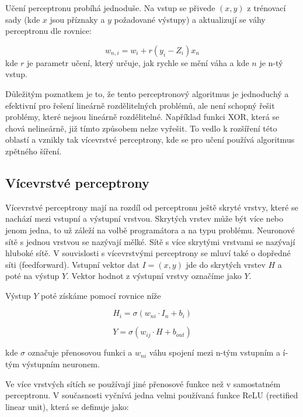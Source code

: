 \documentclass[FM,BP,fonts]{tulthesis}
\begin{document}
Učení perceptronu probíhá jednoduše. Na vstup se přivede $(x,y)$ z trénovací sady (kde $x$ jsou příznaky a $y$ požadované výstupy) a aktualizují se váhy perceptronu dle rovnice:

\begin{equation}\label{eq:learning_percep}
	w_{n,i} = w_i + r(y_i-Z_i)x_n
\end{equation}
kde $r$ je parametr učení, který určuje, jak rychle se mění váha a kde $n$ je n-tý vstup.  

Důležitým poznatkem je to, že tento perceptronový algoritmus je jednoduchý a efektivní pro řešení lineárně rozdělitelných problémů, ale není schopný řešit problémy, které nejsou lineárně rozdělitelné. Například funkci XOR, která se chová nelineárně, již tímto způsobem nelze vyřešit. To vedlo k rozšíření této oblastí a vznikly tak vícevrstvé perceptrony, kde se pro učení používá algoritmus zpětného šíření.




\subsection{Vícevrstvé perceptrony}
Vícevrstvé perceptrony mají na rozdíl od perceptronu ještě skryté vrstvy, které se nachází mezi vstupní a výstupní vrstvou. Skrytých vrstev může být více nebo jenom jedna, to už záleží na volbě programátora a na typu problému. Neuronové sítě s jednou vrstvou se nazývají mělké. Sítě s více skrytými vrstvami se nazývají hluboké sítě. V souvislosti s vícevrstvými perceptrony se mluví také o dopředné síti (feedforward). Vstupní vektor dat $I = (x,y)$ jde do skrytých vrstev $H$ a poté na výstup $Y$. Vektor hodnot z výstupní vrstvy označíme jako $Y$. 

\newpage
Výstup $Y$ poté získáme pomocí rovnice níže 

\begin{equation}
	H_i = \sigma(w_{ni} \cdot I_n + b_i)
\end{equation}


\begin{equation}
	Y = \sigma(w_{ij} \cdot H + b_{out})
\end{equation}

kde $\sigma$ označuje přenosovou funkci a $w_{ni}$ váhu spojení mezi n-tým vstupním a í-tým výstupním neuronem.

Ve více vrstvých sítích se používají jiné přenosové funkce než v samostatném perceptronu. V současnosti vyčnívá jedna velmi používaná funkce ReLU (rectified linear unit), která se definuje jako:
\end{document}
